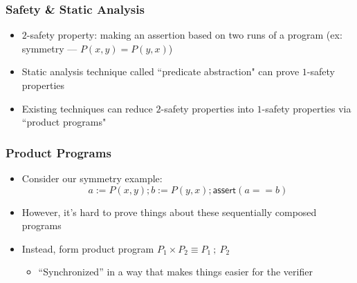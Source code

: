 \documentclass{beamer} %
\theoremstyle{definition} %
\begin{document}
\begin{frame}
\frametitle{Safety \& Static Analysis}

\begin{itemize}
    \item $2$-safety property: making an assertion based on two runs of a program (ex: symmetry --- $P(x,y) = P(y,x)$)
    \item Static analysis technique called ``predicate abstraction" can prove $1$-safety properties
    \item Existing techniques can reduce $2$-safety properties into $1$-safety properties via ``product programs"
\end{itemize}



\end{frame}

\begin{frame}
    \frametitle{Product Programs}
    
    \begin{itemize}
        \item Consider our symmetry example: \[a := P(x,y) ; b := P(y,x) ; \textsf{assert}(a ==b)\]
        \item However, it's hard to prove things about these sequentially composed programs

        \pause
        \item Instead, form product program $P_1 \times P_2 \equiv P_1\ ;\ P_2$ 

        \begin{itemize}
            \item ``Synchronized'' in a way that makes things easier for the verifier
        \end{itemize}
    \end{itemize}
    
    
    \end{frame}
\end{document}
